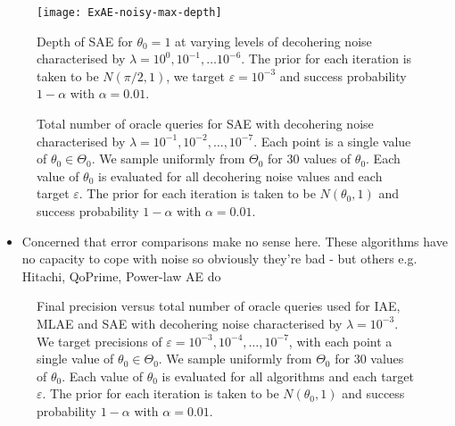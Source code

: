 \begin{figure}[htbp]
	\centering
	\texttt{[image: ExAE-noisy-max-depth]}
	\caption{Depth of SAE for $\theta_0 = 1$ at varying levels of decohering noise characterised by $\lambda = 10^0, 10^{-1}, \ldots 10^{-6}$. The prior for each iteration is taken to be $N(\pi /2, 1)$, we target $\varepsilon = 10^{-3}$ and success probability $1 - \alpha$ with $\alpha = 0.01$.}
	\label{fig::ExAE-noisy-max-depth}
\end{figure}

\begin{figure}[htbp]
	\centering
	\missingfigure{}
	\caption{Total number of oracle queries for SAE with decohering noise characterised by $\lambda = 10^{-1}, 10^{-2}, \ldots, 10^{-7}$. Each point is a single value of $\theta_0 \in \Theta_0$. We sample uniformly from $\Theta_0$ for 30 values of $\theta_0$. Each value of $\theta_0$ is evaluated for all decohering noise values and each target $\varepsilon$. The prior for each iteration is taken to be $N(\theta_0, 1)$ and success probability $1 - \alpha$ with $\alpha = 0.01$.}
	\label{fig::query-exae-noisy}
\end{figure}

\begin{itemize}
	\color{red}
	\item Concerned that error comparisons make no sense here. These algorithms have no capacity to cope with noise so obviously they're bad - but others e.g. Hitachi, QoPrime, Power-law AE do
\end{itemize}

\begin{figure}[htbp]
	\centering
	\missingfigure{}
	\caption{Final precision versus total number of oracle queries used for IAE, MLAE and SAE with decohering noise characterised by $\lambda = 10^{-3}$. We target precisions of $\varepsilon = 10^{-3}, 10^{-4}, \ldots , 10^{-7}$, with each point a single value of $\theta_0 \in \Theta_0$. We sample uniformly from $\Theta_0$ for 30 values of $\theta_0$. Each value of $\theta_0$ is evaluated for all algorithms and each target $\varepsilon$. The prior for each iteration is taken to be $N(\theta_0, 1)$ and success probability $1 - \alpha$ with $\alpha = 0.01$.}
	\label{fig::query-comparison-noisy}
\end{figure}

\newpage



